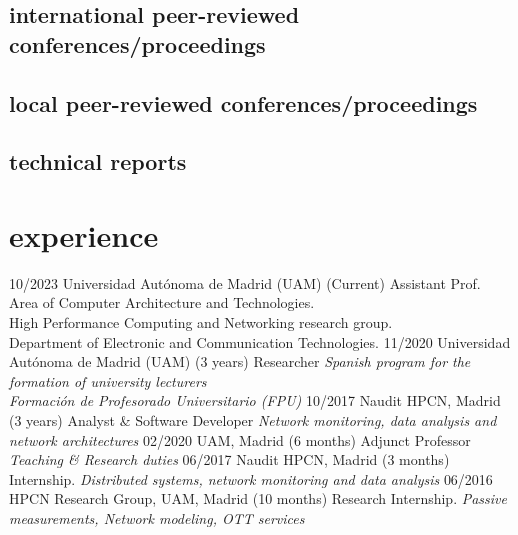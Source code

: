 \documentclass[]{friggeri-cv}
\begin{document}
\subsection{international peer-reviewed conferences/proceedings}
\begin{refsegment}
  \nocite{*}
  \printbibliography[sorting=chronological, type=inproceedings, notkeyword={spanish}, heading=none]
\end{refsegment}
\subsection{local peer-reviewed conferences/proceedings}
\begin{refsegment}
  \nocite{*}
  \printbibliography[sorting=chronological, type=inproceedings, keyword={spanish}, heading=none]
\end{refsegment}
\subsection{technical reports}
\begin{refsegment}
  \nocite{*}
  \printbibliography[sorting=chronological, type=report, heading=none]
\end{refsegment}

\section{experience}

\begin{entrylist}
\entry
    {10/2023}
    {Universidad Autónoma de Madrid (UAM) \hspace{1em} (Current) }
    {Assistant Prof.}
    {Area of Computer Architecture and Technologies. \\
    High Performance Computing and Networking research group.\\
    Department of Electronic and Communication Technologies.
    }
\entry
    {11/2020}
    {Universidad Autónoma de Madrid (UAM) \hspace{1em} (3 years) }
    {Researcher}
    {\emph{Spanish program for the formation of university lecturers \\
    Formación de Profesorado Universitario (FPU)}}
  \entry
    {10/2017}
    {Naudit HPCN, Madrid \hspace{1em} (3 years) }
    {Analyst \& Software Developer}
    {\emph{Network monitoring, data analysis and network architectures}}
\entry
    {02/2020}
    {UAM, Madrid \hspace{1em} (6 months) }
    {Adjunct Professor}
    {\emph{Teaching \& Research duties}}
\entry
    {06/2017}
    {Naudit HPCN, Madrid \hspace{1em} (3 months)}
    {Internship.}
    {\emph{Distributed systems, network monitoring and data analysis}}
    \entry
    {06/2016}
    {HPCN Research Group, UAM, Madrid \hspace{1em} (10 months) }
    {Research Internship.}
    {\emph{Passive measurements, Network modeling, OTT services}}{}
 
\end{entrylist}
\newpage
\end{document}
